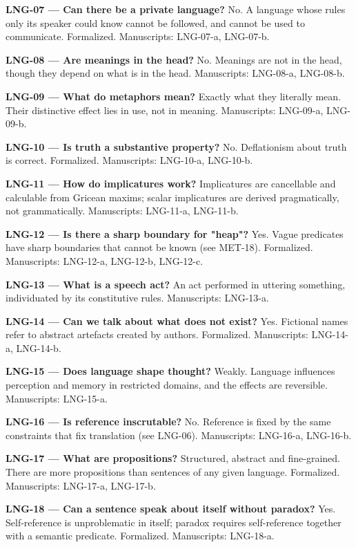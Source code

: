 \documentclass[10pt]{article}
\begin{document}
\textbf{LNG-07 --- Can there be a private language?} No. A language whose rules only its speaker could know cannot be followed, and cannot be used to communicate. Formalized. Manuscripts: LNG-07-a, LNG-07-b.

\textbf{LNG-08 --- Are meanings in the head?} No. Meanings are not in the head, though they depend on what is in the head. Manuscripts: LNG-08-a, LNG-08-b.

\textbf{LNG-09 --- What do metaphors mean?} Exactly what they literally mean. Their distinctive effect lies in use, not in meaning. Manuscripts: LNG-09-a, LNG-09-b.

\textbf{LNG-10 --- Is truth a substantive property?} No. Deflationism about truth is correct. Formalized. Manuscripts: LNG-10-a, LNG-10-b.

\textbf{LNG-11 --- How do implicatures work?} Implicatures are cancellable and calculable from Gricean maxims; scalar implicatures are derived pragmatically, not grammatically. Manuscripts: LNG-11-a, LNG-11-b.

\textbf{LNG-12 --- Is there a sharp boundary for "heap"?} Yes. Vague predicates have sharp boundaries that cannot be known (see MET-18). Formalized. Manuscripts: LNG-12-a, LNG-12-b, LNG-12-c.

\textbf{LNG-13 --- What is a speech act?} An act performed in uttering something, individuated by its constitutive rules. Manuscripts: LNG-13-a.

\textbf{LNG-14 --- Can we talk about what does not exist?} Yes. Fictional names refer to abstract artefacts created by authors. Formalized. Manuscripts: LNG-14-a, LNG-14-b.

\textbf{LNG-15 --- Does language shape thought?} Weakly. Language influences perception and memory in restricted domains, and the effects are reversible. Manuscripts: LNG-15-a.

\textbf{LNG-16 --- Is reference inscrutable?} No. Reference is fixed by the same constraints that fix translation (see LNG-06). Manuscripts: LNG-16-a, LNG-16-b.

\textbf{LNG-17 --- What are propositions?} Structured, abstract and fine-grained. There are more propositions than sentences of any given language. Formalized. Manuscripts: LNG-17-a, LNG-17-b.

\textbf{LNG-18 --- Can a sentence speak about itself without paradox?} Yes. Self-reference is unproblematic in itself; paradox requires self-reference together with a semantic predicate. Formalized. Manuscripts: LNG-18-a.
\end{document}
